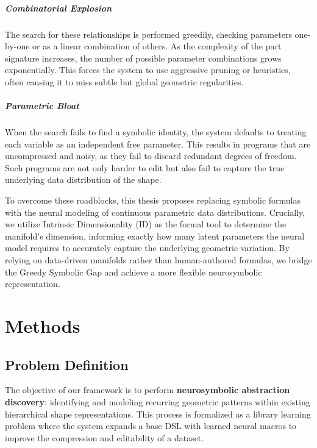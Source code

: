 \documentclass{thesis}
\begin{document}
\paragraph{Combinatorial Explosion} The search for these relationships is performed greedily, checking parameters one-by-one or as a linear combination of others. As the complexity of the part signature increases, the number of possible parameter combinations grows exponentially. This forces the system to use aggressive pruning or heuristics, often causing it to miss subtle but global geometric regularities.

\paragraph{Parametric Bloat} When the search fails to find a symbolic identity, the system defaults to treating each variable as an independent free parameter. This results in programs that are uncompressed and noisy, as they fail to discard redundant degrees of freedom. Such programs are not only harder to edit but also fail to capture the true underlying data distribution of the shape.

To overcome these roadblocks, this thesis proposes replacing symbolic formulas with the neural modeling of continuous parametric data distributions. Crucially, we utilize Intrinsic Dimensionality (ID) as the formal tool to determine the manifold's dimension, informing exactly how many latent parameters the neural model requires to accurately capture the underlying geometric variation. By relying on data-driven manifolds rather than human-authored formulas, we bridge the Greedy Symbolic Gap and achieve a more flexible neurosymbolic representation.


\chapter{Methods}\label{ch:methods}

\section{Problem Definition}
\label{sec:problem_definition}

The objective of our framework is to perform \textbf{neurosymbolic abstraction discovery}: identifying and modeling recurring geometric patterns within existing hierarchical shape representations. This process is formalized as a library learning problem where the system expands a base DSL with learned neural macros to improve the compression and editability of a dataset.
\end{document}
